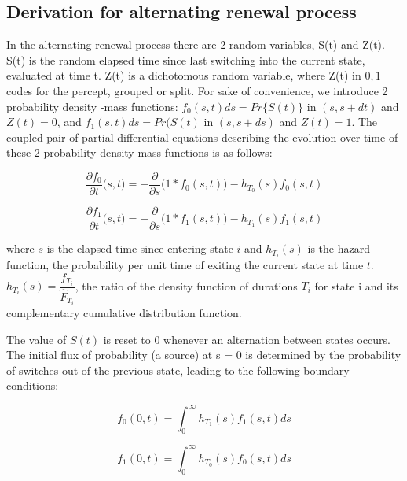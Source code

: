 \documentclass{frontiersSCNS} %
\begin{document}
\subsection{Derivation for alternating renewal process}
In the alternating renewal process there are 2 random variables, S(t) and Z(t). S(t) is the random elapsed time since last switching into the current state, evaluated at time t. Z(t) is a dichotomous random variable, where Z(t) in ${0,1}$ codes for the percept, grouped or split. For sake of convenience, we introduce 2 probability density -mass functions: $f_0(s,t) ds = Pr \lbrace S(t) \rbrace$ in $(s,s+dt)$ and $Z(t)=0$, and $f_1(s,t) ds= Pr(S(t)$ in $(s,s+ds)$ and $Z(t)=1$. The coupled pair of partial differential equations describing the evolution over time of these 2 probability density-mass functions is as follows:

\begin{equation}
\frac{\partial f_0}{\partial t} \big(s,t\big) = -\frac{\partial}{\partial s}\big(1 * f_0(s,t)\big) - h_{T_0}(s) f_0(s,t)
\end{equation}

\begin{equation}
\frac{\partial f_1}{\partial t} \big(s,t\big) = -\frac{\partial}{\partial s} \big(1 * f_1(s,t)\big) - h_{T_1}(s) f_1(s,t)
\end{equation}

where $s$ is the elapsed time since entering state $i$ and $h_{T_i}(s)$ is the hazard function, the probability per unit time of exiting the current state at time $t$. $h_{T_i}(s) = \dfrac{f_{T_i}}{\hat{F}_{T_i}}$, the ratio of the density function of durations $T_i$ for state i and its complementary cumulative distribution function.

The value of $S(t)$ is reset to 0 whenever an alternation between states occurs. The initial flux of probability (a source) at s = 0 is determined by the probability of switches out of the previous state, leading to the following boundary conditions:

\begin{equation}
f_0(0,t) = \int_0^\infty h_{T_1}(s) f_1(s,t) ds
\end{equation}

\begin{equation}
f_1(0,t) = \int_0^\infty h_{T_0}(s) f_0(s,t) ds
\end{equation}
\end{document}
